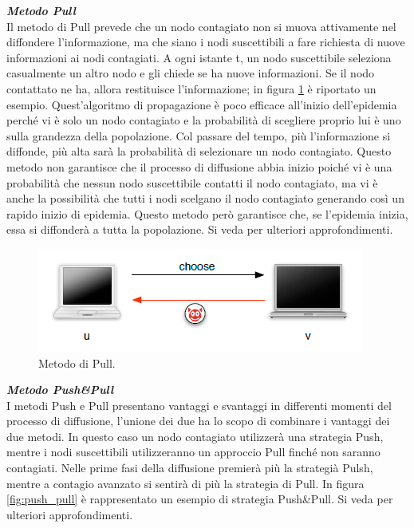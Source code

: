 \noindent\textbf{\textit{Metodo Pull}}\\
Il metodo di Pull prevede che un nodo contagiato non si muova attivamente nel diffondere l'informazione, ma che siano i nodi suscettibili a fare richiesta di nuove informazioni ai nodi contagiati. A ogni istante t, un nodo suscettibile seleziona casualmente un altro nodo e gli chiede se ha nuove informazioni. Se il nodo contattato ne ha, allora restituisce l'informazione; in figura \ref{fig:pull} è riportato un esempio. Quest'algoritmo di propagazione è poco efficace all'inizio dell'epidemia perché vi è solo un nodo contagiato e la probabilità di scegliere proprio lui è uno sulla grandezza della popolazione. Col passare del tempo, più l'informazione si diffonde, più alta sarà la probabilità di selezionare un nodo contagiato. Questo metodo non garantisce che il processo di diffusione abbia inizio poiché vi è una probabilità che nessun nodo suscettibile contatti il nodo contagiato, ma vi è anche la possibilità che tutti i nodi scelgano il nodo contagiato generando così un rapido inizio di epidemia. Questo metodo però garantisce che, se l'epidemia inizia, essa si diffonderà a tutta la popolazione. Si veda \cite{schindel2004-epidemicAlg} per ulteriori approfondimenti.

\begin{figure}[h]
	\centering
	\includegraphics[width=0.6\linewidth,keepaspectratio]{Images/algoritmi_gossip/pull}
	\caption[Metodo di Pull]{Metodo di Pull.}
	\label{fig:pull}
\end{figure}

\noindent\textbf{\textit{Metodo Push\&Pull}}\\
I metodi Push e Pull presentano vantaggi e svantaggi in differenti momenti del processo di diffusione, l'unione dei due ha lo scopo di combinare i vantaggi dei due metodi. In questo caso un nodo contagiato utilizzerà una strategia Push, mentre i nodi suscettibili utilizzeranno un approccio Pull finché non saranno contagiati. Nelle prime fasi della diffusione premierà più la strategià Pulsh, mentre a contagio avanzato si sentirà di più la strategia di Pull. In figura \ref{fig:push_pull} è rappresentato un esempio di strategia Push\&Pull. Si veda \cite{schindel2004-epidemicAlg} per ulteriori approfondimenti.

